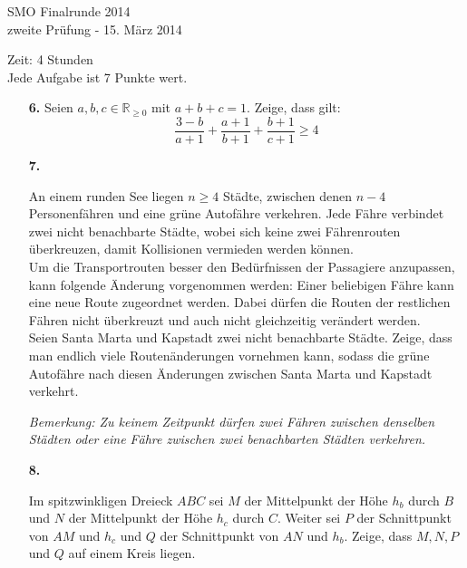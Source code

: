 \documentclass[11pt,a4paper]{article}
\theoremstyle{plain}
\theoremstyle{definition}
\newcommand{\R}{\mathbb{R}}
\begin{document}
\newpage

\begin{center}
{\huge SMO Finalrunde 2014} \\
\medskip zweite Prüfung - 15. März 2014
\end{center}
\vspace{8mm}
Zeit: 4 Stunden\\
Jede Aufgabe ist 7 Punkte wert.

\vspace{15mm}

\begin{enumerate}

\item[\textbf{6.}]
Seien $a,b,c \in \R_{\geq 0}$ mit $a+b+c=1$. Zeige, dass gilt:
\[
\frac{3-b}{a+1}+\frac{a+1}{b+1}+\frac{b+1}{c+1}\geq 4
\]

\bigskip

\item[\textbf{7.}]

An einem runden See liegen $n\geq 4$ Städte, zwischen denen $n-4$ Personenfähren und eine grüne Autofähre verkehren. Jede Fähre verbindet zwei nicht benachbarte Städte, wobei sich keine zwei Fährenrouten überkreuzen, damit Kollisionen vermieden werden können.\\
Um die Transportrouten besser den Bedürfnissen der Passagiere anzupassen, kann folgende Änderung vorgenommen werden: Einer beliebigen Fähre kann eine neue Route zugeordnet werden. Dabei dürfen die Routen der restlichen Fähren nicht überkreuzt und auch nicht gleichzeitig verändert werden.\\
Seien Santa Marta und Kapstadt zwei nicht benachbarte Städte. Zeige, dass man endlich viele Routenänderungen vornehmen kann, sodass die grüne Autofähre nach diesen Änderungen zwischen Santa Marta und Kapstadt verkehrt.

\emph{Bemerkung: Zu keinem Zeitpunkt dürfen zwei Fähren zwischen denselben Städten oder eine Fähre zwischen zwei benachbarten Städten verkehren.}

\bigskip

\item[\textbf{8.}]

Im spitzwinkligen Dreieck $ABC$ sei $M$ der Mittelpunkt der Höhe $h_b$ durch $B$ und $N$ der Mittelpunkt der Höhe $h_c$ durch $C$. Weiter sei $P$ der Schnittpunkt von $AM$ und $h_c$ und $Q$ der Schnittpunkt von $AN$ und $h_b$. Zeige, dass $M, N, P$ und $Q$ auf einem Kreis liegen.

\bigskip


\end{enumerate}
\end{document}
